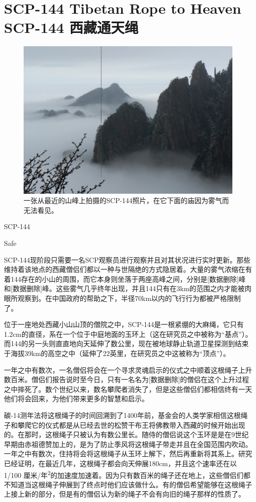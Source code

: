 \chapter[SCP-144 西藏通天绳]{
    SCP-144 Tibetan Rope to Heaven\\
    SCP-144 西藏通天绳
}

\label{chap:SCP-144}

\begin{figure}[H]
    \centering
    \includegraphics[width=0.5\linewidth]{images/SCP.144.jpg}
    \caption*{一张从最近的山峰上拍摄的SCP-144照片，在它下面的庙因为雾气而无法看见。}
\end{figure}

SCP-144

Safe

SCP-144现阶段只需要一名SCP观察员进行观察并且对其状况进行实时更新。那些维持着该地点的西藏僧侣们都以一种与世隔绝的方式隐居着。大量的雾气浓缩在有着144存在的小山的周围，而它本身则坐落于两座高峰之间，分别是{[}数据删除]峰和{[}数据删除]峰。这些雾气几乎终年出现，并且144只有在3km的范围之内才能被肉眼所观察到。在中国政府的帮助之下，半径70km以内的飞行行为都被严格限制了。

位于一座地处西藏小山山顶的僧院之中，SCP-144是一根紧绷的大麻绳，它只有1.2cm的直径，系在一个位于中庭地面的玉环上（这在研究员之中被称为“基点”）。而144的另一头则直直地向天延伸了数公里，现在被地球静止轨道卫星探测到结束于海拔39km的高空之中（延伸了22英里，在研究员之中这被称为“顶点”）。

一年之中有数次，一名僧侣将会在一个寻求灵魂启示的仪式之中顺着这根绳子上升数百米。僧侣们报告说时至今日，只有一名名为{[}数据删除]的僧侣在这个上升过程之中摔死了。数个世纪以来，数名攀爬者消失了，但是这些僧侣们都相信终有一天他们将会回来，为他们带来更多的智慧和启示。

碳-14测年法将这根绳子的时间回溯到了1400年前，基金会的人类学家相信这根绳子和攀爬它的仪式都是从已经去世的松赞干布王将佛教带入西藏的时候开始出现的。在那时，这根绳子只被认为有数公里长。随侍的僧侣说这个玉环是是在9世纪早期由赤祖德赞加上的，是为了防止季风将这根绳子带走并且在全国范围内吹动。一年之中有数次，住持将会将这根绳子从玉环上解下，然后再重新将其系上。研究已经证明，在最近几年，这根绳子都会向天伸展180cm，并且这个速率还在以1\slash 100 厘米\slash 年\textsuperscript{2}的加速度加速着。因为只有数百米的绳子还在地上，这些僧侣们都不知道当这根绳子伸展到了终点时他们应该做什么。有的僧侣希望能够在这根绳子上接上新的部分，但是有的僧侣认为新的绳子不会有向旧的绳子那样的性质了。

